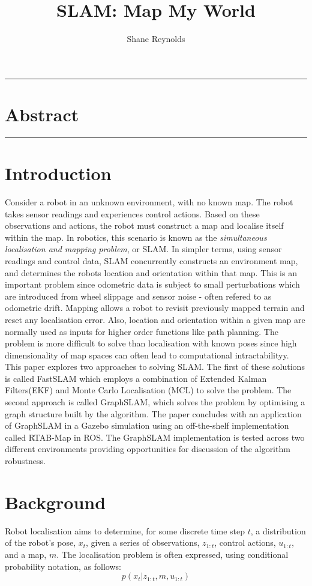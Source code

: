 \documentclass[a4paper]{article}
\begin{document}
\title{SLAM: Map My World}
\author{Shane Reynolds}
\maketitle

\rule{\textwidth}{1pt}
\section*{Abstract}
\lipsum[10]

\rule{\textwidth}{1pt}

\section{Introduction}
Consider a robot in an unknown environment, with no known map. The robot takes sensor readings and experiences control actions. Based on these observations and actions, the robot must construct a map and localise itself within the map. In robotics, this scenario is known as the \textit{simultaneous localisation and mapping problem}, or SLAM. In simpler terms, using sensor readings and control data, SLAM concurrently constructs an environment map, and determines the robots location and orientation within that map. This is an important problem since odometric data is subject to small perturbations which are introduced from wheel slippage and sensor noise - often refered to as odometric drift. Mapping allows a robot to revisit previously mapped terrain and reset any localisation error. Also, location and orientation within a given map are normally used as inputs for higher order functions like path planning. The problem is more difficult to solve than localisation with known poses since high dimensionality of map spaces can often lead to computational intractabilityy. This paper explores two approaches to solving SLAM. The first of these solutions is called FastSLAM which employs a combination of Extended Kalman Filters(EKF) and Monte Carlo Localisation (MCL) to solve the problem. The second approach is called GraphSLAM, which solves the problem by optimising a graph structure built by the algorithm. The paper concludes with an application of GraphSLAM in a Gazebo simulation using an off-the-shelf implementation called RTAB-Map in ROS. The GraphSLAM implementation is tested across two different environments providing opportunities for discussion of the algorithm robustness.

\section{Background}
Robot localisation aims to determine, for some discrete time step $t$, a distribution of the robot's pose, $x_t$, given a series of observations, $z_{1:t}$, control actions, $u_{1:t}$, and a map, $m$. The localisation problem is often expressed, using conditional probability notation, as follows:
\begin{equation}
p(x_t | z_{1:t}, m, u_{1:t})
\end{equation}
\end{document}
